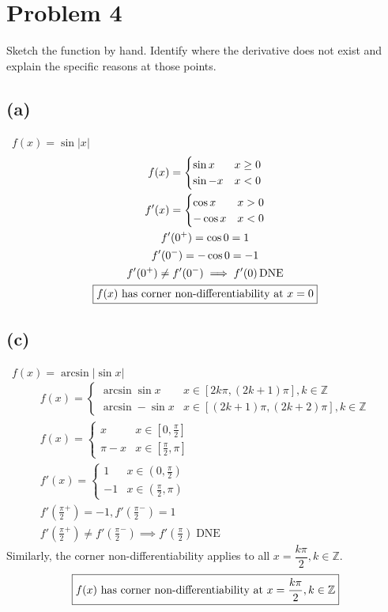 \documentclass[12pt]{article}
\newcommand{\vem}{\vspace{0.5em}}
\newcommand{\problem}[1]{\section{Problem #1}}
\newcommand{\subproblem}[1]{\subsection{(#1)} \,}
\DeclareMathOperator{\dne}{DNE}
\begin{document}
\problem{4}
 Sketch the function by hand. Identify where the derivative does not exist and explain the specific reasons at those points. \vem

 \subproblem{a} $f(x)=\sin |x|$
 \begin{gather*}
    f(x)=\begin{cases}
        \sin x &x \ge 0\\
        \sin -x & x<0
    \end{cases}\\
    f'(x)=\begin{cases}
        \cos x &x >0\\
        -\cos x &x<0
    \end{cases}\\
     f'(0^+)=\cos 0 = 1\\
     f'(0^-)=- \cos 0 =-1\\
     f'(0^+) \ne f'(0^-) \implies f'(0) \dne\\
     \boxed{f(x) $ has corner non-differentiability at $ x=0}
 \end{gather*}

 \subproblem{c} $f(x)= \arcsin |\sin x|$
 \begin{gather*}
     f(x)=\begin{cases}
         \arcsin \sin x & x\in [2k\pi, (2k+1)\pi], k\in \mathbb{Z}\\
         \arcsin -\sin x & x\in [(2k+1)\pi, (2k+2)\pi], k\in \mathbb{Z}
     \end{cases}\\
     f(x)=\begin{cases}
         x &x\in [0,\frac{\pi}{2}]\\
         \pi-x &x\in [\frac{\pi}{2},\pi]
     \end{cases}\\
     f'(x)=\begin{cases}
         1 &x\in (0,\frac{\pi}{2})\\
         -1 &x\in (\frac{\pi}{2},\pi)
     \end{cases}\\
     f'(\frac{\pi}{2}^+)=-1, f'(\frac{\pi}{2}^-)=1\\
     f'(\frac{\pi}{2}^+)\ne f'(\frac{\pi}{2}^-) \implies f'(\frac{\pi}{2}) \dne
     \end{gather*}
Similarly, the corner non-differentiability applies to all $x=\dfrac{k\pi}{2}, k\in \mathbb{Z}$.
\[
\boxed{f(x) $ has corner non-differentiability at $ x=\dfrac{k\pi}{2}, k\in \mathbb{Z}}
\]
\end{document}
